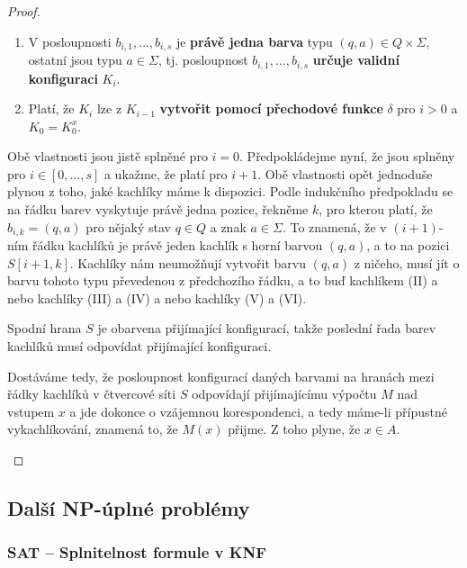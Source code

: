 \documentclass[11pt]{report} %
\numberwithin{equation}{section}
\begin{document}
\begin{proof}
\begin{description}
\begin{enumerate}
		
		\item V posloupnosti $b_{i,1}, \dots, b_{i,s}$ je \textbf{právě jedna barva} typu $(q, a) \in Q \times \Sigma$, ostatní jsou typu $a \in \Sigma$, tj. posloupnost $b_{i,1}, \dots, b_{i,s}$ \textbf{určuje validní konfiguraci} $K_i$.
		\item Platí, že $K_i$ lze z $K_{i-1}$ \textbf{vytvořit pomocí přechodové funkce} $\delta$ pro $i > 0$ a $K_0 = K_0^x$.
	\end{enumerate}

	Obě vlastnosti jsou jistě splněné pro $i = 0$. Předpokládejme nyní, že jsou splněny pro $i \in [0, \dots, s]$ a ukažme, že platí pro $i + 1$. Obě vlastnosti opět jednoduše plynou z toho, jaké kachlíky máme k dispozici. Podle indukčního předpokladu se na řádku barev vyskytuje právě jedna pozice, řekněme $k$, pro kterou platí, že $b_{i,k} = (q, a)$ pro nějaký stav $q \in Q$ a znak $a \in \Sigma$. To znamená, že v $(i + 1)$-ním řádku kachlíků je právě jeden kachlík s horní barvou $(q, a)$, a to na pozici $S[i+1, k]$. Kachlíky nám neumožňují vytvořit barvu $(q, a)$ z ničeho, musí jít o barvu tohoto typu převedenou z předchozího řádku, a to buď kachlíkem (II) a nebo kachlíky (III) a (IV) a nebo kachlíky (V) a (VI).

	Spodní hrana $S$ je obarvena přijímající konfigurací, takže poslední řada barev kachlíků musí
	odpovídat přijímající konfiguraci. 
	
	Dostáváme tedy, že posloupnost konfigurací daných barvami na hranách mezi řádky kachlíků v čtvercové síti $S$ odpovídají přijímajícímu výpočtu $M$ nad vstupem $x$ a jde dokonce o vzájemnou korespondenci, a tedy máme-li přípustné vykachlíkování, znamená to, že $M(x)$ přijme. Z toho plyne, že $x \in A.$
\end{description}


\end{proof}

\subsection{Další NP-úplné problémy}
\subsubsection{SAT -- Splnitelnost formule v KNF}
\begin{minipage}{\textwidth}
	\bigskip
	\centering
	\bigskip
\end{minipage}
\end{document}
